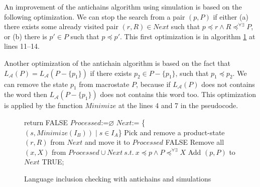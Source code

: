 An improvement of the antichains algorithm using simulation \cite{tacas10} is based on the following optimization. 
We can stop the search from a pair $(p,P)$ if either (a) there exists some already visited pair $(r,R) \in Next$ 
such that $p\preceq r \wedge R\preceq^{\forall\exists}P$, 
or (b) there is $p' \in P$ such that $p \preceq p'$. This first
optimization is in algorithm \ref{algAntichain} at lines 11--14.

Another optimization \cite{tacas10} of the antichain algorithm is based on the fact 
that $L_\mathcal{A}(P)=L_\mathcal{A}(P-\{p_1\})$ if there exists $p_2 \in P-\{p_1\}$, such that $p_1 \preceq p_2$. We can remove the state $p_1$ 
from macrostate $P$, because if $L_\mathcal{A}(P)$ does not contains the word 
then $L_\mathcal{A}(P-\{p_1\})$ does not contains this word too. This optimization is applied by the function $Minimize$ at
the lines 4 and 7 in the pseudocode.

\begin{figure}[bt]
\begin{algorithm}[H]
	\label{algAntichain}
			{return FALSE\;}
		$Processed$:=$\varnothing$\;
		$Next$:= \{$(s,Minimize(I_B))\mid s\in I_A$\}\;
		{
			Pick and remove a product-state $(r,R)$ from $Next$ and move it to $Processed$\;
			\ForEach{$(p,P)\in \{(r',Minimize(R'))\mid (r',R')\in Post((r,R))\}$}
			{
				{
					\Return FALSE\;}
					{
						{
							{
							 Remove all $(x,X)$ from $Processed\cup Next\ s.t.\ x\preceq p \wedge P\preceq^{\forall \exists}X$\;
							 Add $(p,P)$ to $Next$\;
							}
						}
				 }
		  }
		}
		\Return TRUE;
	\caption{Language inclusion checking with antichains and simulations}
\end{algorithm}
\end{figure}

